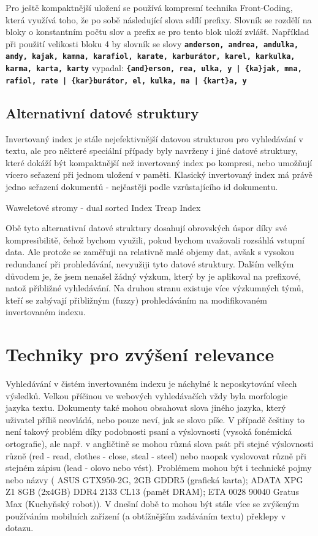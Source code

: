 \documentclass[11pt,letterpaper,oneside,openright]{book}
\newcommand{\bftt}[1]{\texttt{\textbf{#1}}}
\begin{document}
Pro ještě kompaktnější uložení se používá kompresní technika Front-Coding,
která využívá toho, že po sobě následující slova sdílí prefixy. Slovník se
rozdělí na bloky o konstantním počtu slov a prefix se pro tento blok uloží
zvlášť. Například při použití velikosti bloku 4 by slovník se slovy
\bftt{anderson, andrea, andulka, andy, kajak, kamna, karafiol, karate,
karburátor, karel, karkulka, karma, karta, karty} vypadal:
\bftt{\{and\}erson, rea, ulka, y | \{ka\}jak, mna, rafiol, rate | \{kar\}burátor, el, kulka, ma | \{kart\}a, y}


\subsection{Alternativní datové struktury}
Invertovaný index je stále nejefektivnější datovou strukturou pro vyhledávání v
textu, ale pro některé speciální případy byly navrženy i jiné datové struktury,
které dokáží být kompaktnější než invertovaný index po kompresi, nebo umožňují
vícero seřazení při jednom uložení v paměti. Klasický invertovaný index má
právě jedno seřazení dokumentů - nejčastěji podle vzrůstajícího id dokumentu.

Waweletové stromy - dual sorted Index Treap Index

Obě tyto alternativní datové struktury dosahují obrovských úspor díky
své kompresibilitě, čehož bychom využili, pokud bychom uvažovali
rozsáhlá vstupní data. Ale protože se zaměřuji na relativně malé objemy
dat, avšak s vysokou redundancí při prohledávání, nevyužiji tyto datové
struktury. Dalším velkým důvodem je, že jsem nenašel žádný výzkum, který
by je aplikoval na prefixové, natož přibližné vyhledávání. Na druhou
stranu existuje více výzkumných týmů, kteří se zabývají přibližným
(fuzzy) prohledáváním na modifikovaném invertovaném indexu.

\section{Techniky pro zvýšení relevance}
Vyhledávání v čistém invertovaném indexu je náchylné k neposkytování všech
výsledků. Velkou příčinou ve webových vyhledávačích vždy byla morfologie jazyka
textu. Dokumenty také mohou obsahovat slova jiného jazyka, který uživatel
příliš neovládá, nebo pouze neví, jak se slovo píše. V případě češtiny to není
takový problém díky podobnosti psaní a výslovnosti (vysoká fonémická
ortografie), ale např. v angličtině se mohou různá slova psát při stejné
výslovnosti různě (red - read, clothes - close, steal - steel) nebo naopak
vyslovovat různě při stejném zápisu (lead - olovo nebo vést). Problémem mohou
být i technické pojmy nebo názvy ( ASUS GTX950-2G, 2GB GDDR5 (grafická karta);
ADATA XPG Z1 8GB (2x4GB) DDR4 2133 CL13 (paměť DRAM); ETA 0028 90040 Gratus Max
(Kuchyňský robot)). V dnešní době to mohou být stále více se zvýšeným
používáním mobilních zařízení (a obtížnějším zadáváním textu) překlepy v
dotazu.
\end{document}
